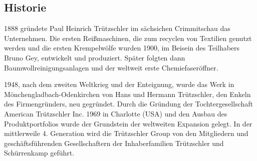 \subsection{Historie}
    1888 gründete Paul Heinrich Trützschler im sächsichen Crimmitschau das Unternehmen.
    Die ersten Reißmaschinen, die zum recyclen von Textilien genutzt werden und die ersten Krempelwölfe wurden 1900, im Beisein des Teilhabers Bruno Gey, entwickelt und produziert. \cite{noauthor_trutzschler_nodate}
    Später folgten dann Baumwollreinigungsanlagen und der weltweit erste Chemiefaseröffner.

    1948, nach dem zweiten Weltkrieg und der Enteignung, wurde das Werk in Mönchengladbach-Odenkirchen von Hans und Hermann Trützschler, den Enkeln des Firmengründers, neu gegründet. \cite{noauthor_trutzschler_nodate-1}
    Durch die Gründung der Tochtergesellschaft American Trützschler Inc. 1969 in Charlotte (USA) und den Ausbau des Produktportfolios wurde der Grundstein der weltweiten Expansion gelegt.
    In der mittlerweile 4. Generation wird die Trützschler Group von den Mitgliedern und geschäftsführenden Gesellschaftern der Inhaberfamilien Trützschler und Schürrenkamp geführt. \cite{noauthor_familienunternehmen_nodate}
